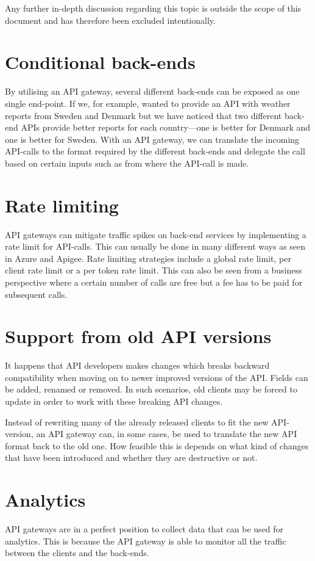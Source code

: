 \documentclass{cslthse-msc}
\begin{document}
Any further in-depth discussion regarding this topic is outside the scope of this document and has therefore been excluded intentionally.

\section{Conditional back-ends}
By utilising an API gateway, several different back-ends can be exposed as one single end-point. If we, for example, wanted to provide an API with weather reports from Sweden and Denmark but we have noticed that two different back-end APIs provide better reports for each country---one is better for Denmark and one is better for Sweden. With an API gateway, we can translate the incoming API-calls to the format required by the different back-ends and delegate the call based on certain inputs such as from where the API-call is made.

\section{Rate limiting}
API gateways can mitigate traffic spikes on back-end services by implementing a rate limit for API-calls. This can usually be done in many different ways as seen in Azure\cite{azure_rate_limit} and Apigee\cite{apigee_rate_limit}. Rate limiting strategies include a global rate limit, per client rate limit or a per token rate limit. This can also be seen from a business perspective where a certain number of calls are free but a fee has to be paid for subsequent calls.

\section{Support from old API versions}
It happens that API developers makes changes which breaks backward compatibility when moving on to newer improved versions of the API. Fields can be added, renamed or removed. In such scenarios, old clients may be forced to update in order to work with these breaking API changes.

Instead of rewriting many of the already released clients to fit the new API-version, an API gateway can, in some cases, be used to translate the new API format back to the old one. How feasible this is depends on what kind of changes that have been introduced and whether they are destructive or not.

\section{Analytics}
API gateways are in a perfect position to collect data that can be used for analytics. This is because the API gateway is able to monitor all the traffic between the clients and the back-ends. 
\end{document}
